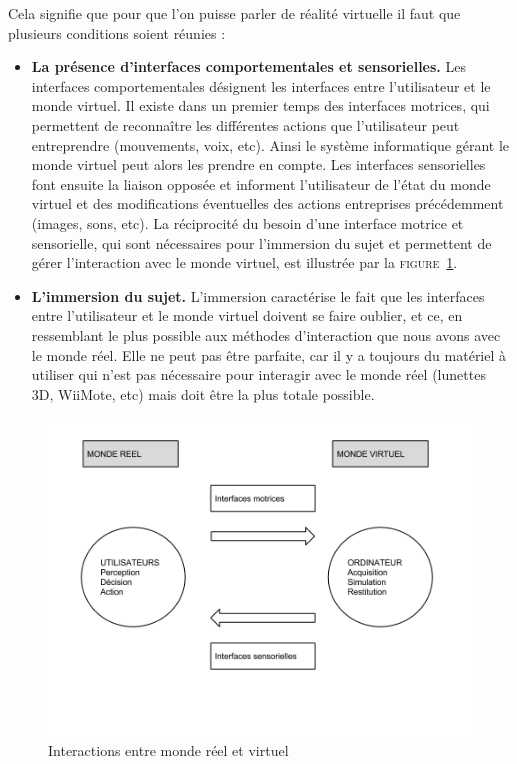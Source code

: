 Cela signifie que pour que l'on puisse parler de réalité virtuelle il faut que plusieurs conditions soient réunies :
\\
\begin{itemize}\renewcommand{\labelitemi}{$\bullet$}
\item \textbf{La présence d'interfaces comportementales et sensorielles. }
Les interfaces comportementales désignent les interfaces entre l'utilisateur et le monde virtuel. Il existe dans un premier temps des interfaces motrices, qui permettent de reconnaître les différentes actions que l'utilisateur peut entreprendre (mouvements, voix, etc). Ainsi le système informatique gérant le monde virtuel peut alors les prendre en compte. Les interfaces sensorielles font ensuite la liaison opposée et informent l'utilisateur de l'état du monde virtuel et des modifications éventuelles des actions entreprises précédemment (images, sons, etc). La réciprocité du besoin d'une interface motrice et sensorielle, qui sont nécessaires pour l'immersion du sujet et permettent de gérer l'interaction avec le monde virtuel, est illustrée par la \textsc{figure~\ref{interfaces}}.
\item \textbf{L'immersion du sujet.}
L'immersion caractérise le fait que les interfaces entre l'utilisateur et le monde virtuel doivent se faire oublier, et ce, en ressemblant le plus possible aux méthodes d'interaction que nous avons avec le monde réel. Elle ne peut pas être parfaite, car il y a toujours du matériel à utiliser qui n'est pas nécessaire pour interagir avec le monde réel (lunettes 3D, WiiMote, etc) mais doit être la plus totale possible.\\

\end{itemize}
\begin{figure}[h!]
  \caption{Interactions entre monde réel et virtuel \cite{traiteRV1}}
  \label{interfaces}
  \includegraphics[scale=0.4,bb=0 0 720 720]{1-PreEtude/img/graphe_interfaces.png}
\end{figure}

